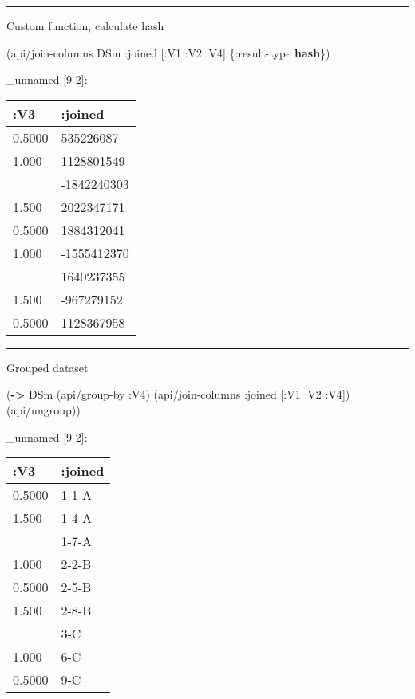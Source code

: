 \documentclass[]{article}
\newenvironment{Shaded}{\begin{snugshade}}{\end{snugshade}}
\newcommand{\KeywordTok}[1]{\textcolor[rgb]{0.13,0.29,0.53}{\textbf{#1}}}
\newcommand{\AttributeTok}[1]{\textcolor[rgb]{0.77,0.63,0.00}{#1}}
\newcommand{\NormalTok}[1]{#1}
\begin{document}
\begin{center}\rule{0.5\linewidth}{0.5pt}\end{center}

Custom function, calculate hash

\begin{Shaded}
\begin{Highlighting}[]
\NormalTok{(api/join-columns DSm }\AttributeTok{:joined}\NormalTok{ [}\AttributeTok{:V1} \AttributeTok{:V2} \AttributeTok{:V4}\NormalTok{] \{}\AttributeTok{:result-type} \KeywordTok{hash}\NormalTok{\})}
\end{Highlighting}
\end{Shaded}

\_unnamed {[}9 2{]}:

\begin{longtable}[]{@{}ll@{}}
\toprule
:V3 & :joined\tabularnewline
\midrule
\endhead
0.5000 & 535226087\tabularnewline
1.000 & 1128801549\tabularnewline
& -1842240303\tabularnewline
1.500 & 2022347171\tabularnewline
0.5000 & 1884312041\tabularnewline
1.000 & -1555412370\tabularnewline
& 1640237355\tabularnewline
1.500 & -967279152\tabularnewline
0.5000 & 1128367958\tabularnewline
\bottomrule
\end{longtable}

\begin{center}\rule{0.5\linewidth}{0.5pt}\end{center}

Grouped dataset

\begin{Shaded}
\begin{Highlighting}[]
\NormalTok{(}\KeywordTok{->}\NormalTok{ DSm}
\NormalTok{    (api/group-by }\AttributeTok{:V4}\NormalTok{)}
\NormalTok{    (api/join-columns }\AttributeTok{:joined}\NormalTok{ [}\AttributeTok{:V1} \AttributeTok{:V2} \AttributeTok{:V4}\NormalTok{])}
\NormalTok{    (api/ungroup))}
\end{Highlighting}
\end{Shaded}

\_unnamed {[}9 2{]}:

\begin{longtable}[]{@{}ll@{}}
\toprule
:V3 & :joined\tabularnewline
\midrule
\endhead
0.5000 & 1-1-A\tabularnewline
1.500 & 1-4-A\tabularnewline
& 1-7-A\tabularnewline
1.000 & 2-2-B\tabularnewline
0.5000 & 2-5-B\tabularnewline
1.500 & 2-8-B\tabularnewline
& 3-C\tabularnewline
1.000 & 6-C\tabularnewline
0.5000 & 9-C\tabularnewline
\bottomrule
\end{longtable}
\end{document}

